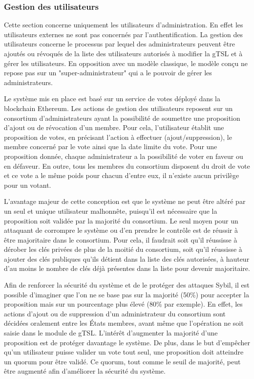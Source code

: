 \documentclass{tnreport}
\begin{document}
\subsubsection{Gestion des utilisateurs}

Cette section concerne uniquement les utilisateurs d'administration. En effet les utilisateurs externes ne sont pas concernés par l'authentification.
La gestion des utilisateurs concerne le processus par lequel des administrateurs peuvent être ajoutés ou révoqués de la liste des utilisateurs autorisés à modifier la gTSL et à gérer les utilisateurs. 
En opposition avec un modèle classique, le modèle conçu ne repose pas sur un "super-administrateur" qui a le pouvoir de gérer les administrateurs. 

Le système mis en place est basé sur un service de votes déployé dans la blockchain Ethereum. Les actions de gestion des utilisateurs reposent sur un consortium d'administrateurs ayant la possibilité de soumettre une proposition d'ajout ou de révocation d'un membre. Pour cela, l'utilisateur établit une proposition de votes, en précisant l'action à effectuer (ajout/suppression), le membre concerné par le vote ainsi que la date limite du vote. Pour une proposition donnée, chaque administrateur a la possibilité de voter en faveur ou en défaveur. En outre, tous les membres du consortium disposent du droit de vote et ce vote a le même poids pour chacun d'entre eux, il n'existe aucun privilège pour un votant.

L'avantage majeur de cette conception est que le système ne peut être altéré par un seul et unique utilisateur malhonnête, puisqu'il est nécessaire que la proposition soit validée par la majorité du consortium. Le seul moyen pour un attaquant de corrompre le système ou d'en prendre le contrôle est de réussir à être majoritaire dans le consortium. Pour cela, il faudrait soit qu'il réussisse à dérober les clés privées de plus de la moitié du consortium, soit qu'il réussisse à ajouter des clés publiques qu'ils détient dans la liste des clés autorisées, à hauteur d'au moins le nombre de clés déjà présentes dans la liste pour devenir majoritaire. 

Afin de renforcer la sécurité du système et de le protéger des attaques Sybil, il est possible d'imaginer que l'on ne se base pas sur la majorité (50\%) pour accepter la proposition mais sur un pourcentage plus élevé (80\% par exemple). En effet, les actions d'ajout ou de suppression d'un administrateur du consortium sont décidées oralement entre les États membres, avant même que l'opération ne soit saisie dans le module de gTSL. L'intérêt d'augmenter la majorité d'une proposition est de protéger davantage le système. De plus, dans le but d'empêcher qu'un utilisateur puisse valider un vote tout seul, une proposition doit atteindre un quorum pour être validé. Ce quorum, tout comme le seuil de majorité, peut être augmenté afin d'améliorer la sécurité du système.
\end{document}
